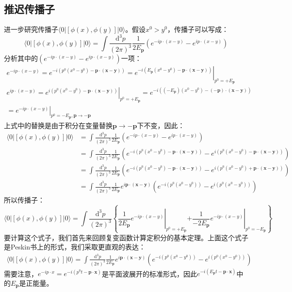 \documentclass{book}
\begin{document}
\subsection{推迟传播子}
进一步研究传播子$\langle0|\left[\phi(x),\phi(y)\right]|0\rangle$。假设$x^0>y^0$，传播子可以写成：
$$
\langle0|\left[\phi(x),\phi(y)\right]|0\rangle=\int\frac{\mathrm{d}^3p}{(2\pi)^3}\frac1{2E_\mathbf{p}}(e^{-ip\cdot(x-y)}-e^{ip\cdot(x-y)})
$$
分析其中的$(e^{-ip\cdot(x-y)}-e^{ip\cdot(x-y)})$一项：
\begin{gather*}
e^{-ip\cdot(x-y)}=e^{-i\left(p^0(x^0-y^0)-\mathbf{p}\cdot(\mathbf{x}-\mathbf{y})\right)}=\left. e^{-i\left(E_\mathbf{p}(x^0-y^0)-\mathbf{p}\cdot(\mathbf{x}-\mathbf{y})\right)}\right|_{p^0=+E_\mathbf p} \\
e^{ip\cdot(x-y)}=\left.e^{i\left(p^0(x^0-y^0)-\mathbf{p}\cdot(\mathbf{x}-\mathbf{y})\right)}\right|_{p^0=+E_\mathbf{p}}=e^{-i\left((-E_\mathbf{p})(x^0-y^0)-(-\mathbf{p})\cdot(\mathbf{x}-\mathbf{y})\right)}\\=\left.e^{-ip\cdot(x-y)}\right|_{p^0=-E_\mathbf{p},\mathbf{p}\to-\mathbf{p}}
\end{gather*}
上式中的替换是由于积分在变量替换$\mathbf{p}\to -\mathbf{p}$下不变，因此：
$$
\begin{aligned}
\langle0|\left[\phi(x),\phi(y)\right]|0\rangle&=\int\frac{\mathrm{d}^3p}{(2\pi)^3}\frac1{2E_\mathbf{p}}(e^{-ip\cdot(x-y)}-e^{ip\cdot(x-y)})\\&=\int\frac{\mathrm{d}^3p}{(2\pi)^3}\frac{1}{2E_\mathbf{p}}(e^{-i(p^0(x^0-y^0)-\mathbf{p}\cdot(\mathbf{x}-\mathbf{y}))}-e^{i(p^0(x^0-y^0)-\mathbf{p}\cdot(\mathbf{x}-\mathbf{y}))}) \\
&=\int\frac{\mathrm{d}^3p}{(2\pi)^3}\frac{1}{2E_\mathbf{p}}(e^{-i(p^0(x^0-y^0)-\mathbf{p}\cdot(\mathbf{x}-\mathbf{y}))}-e^{i(p^0(x^0-y^0)+\mathbf{p}\cdot(\mathbf{x}-\mathbf{y}))}) \\
&=\int\frac{\mathrm{d}^3p}{(2\pi)^3}\frac{1}{2E_\mathbf{p}}e^{i\mathbf{p}\cdot(\mathbf{x}-\mathbf{y})}(e^{-i(p^0(x^0-y^0))}-e^{i(p^0(x^0-y^0))})
\end{aligned}
$$
所以传播子：
$$
\langle0|\left[\phi(x),\phi(y)\right]|0\rangle
=\int\frac{\mathrm{d}^3p}{(2\pi)^3}\left\{\left.\frac1{2E_{\mathbf{p}}}e^{-ip\cdot(x-y)}\right|_{p^0=+E_{\mathbf{p}}}\left.+\frac1{-2E_{\mathbf{p}}}e^{-ip\cdot(x-y)}\right|_{p^0=-E_{\mathbf{p}}}\right\}
$$
要计算这个式子，我们首先来回顾复变函数计算定积分的基本定理。上面这个式子是Peskin书上的形式，我们采取更直观的表达：
$$
\begin{aligned}
\langle0|\left[\phi(x),\phi(y)\right]|0\rangle=\int\frac{\mathrm{d}^3p}{(2\pi)^3}\frac{1}{2E_\mathbf{p}}e^{i\mathbf{p}\cdot(\mathbf{x}-\mathbf{y})}(e^{-i(p^0(x^0-y^0))}-e^{i(p^0(x^0-y^0))}) 
\end{aligned}
$$
需要注意，$e^{-ip\cdot x}=e^{-i(p^0t-\mathbf{p}\cdot\mathbf{x})}$是平面波展开的标准形式，因此$e^{-i(E_\mathbf{p}t-\mathbf{p}\cdot\mathbf{x})}$中的$E_\mathbf{p}$是正能量。
\end{document}
